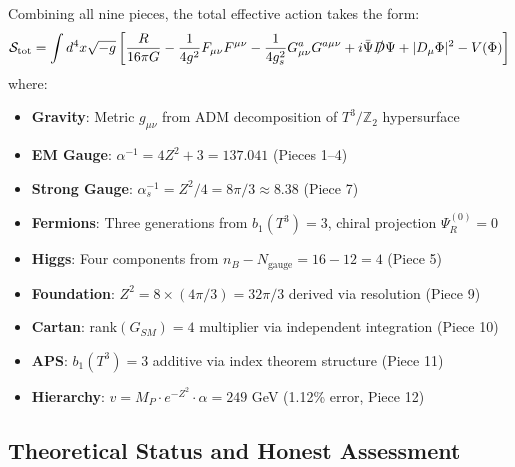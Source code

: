 \documentclass[12pt,a4paper]{article}
\newcommand{\Ztwo}{\mathbb{Z}_2}
\newcommand{\Tthree}{T^3}
\newcommand{\Zsq}{Z^2}
\begin{document}
Combining all nine pieces, the total effective action takes the form:
\begin{equation}
\mathcal{S}_{\text{tot}} = \int d^4x \sqrt{-g} \left[ \frac{R}{16\pi G} - \frac{1}{4g^2}F_{\mu\nu}F^{\mu\nu} - \frac{1}{4g_s^2}G^a_{\mu\nu}G^{a\mu\nu} + i\bar{\Psi}\slashed{D}\Psi + |D_\mu\Phi|^2 - V(\Phi) \right]
\end{equation}
where:
\begin{itemize}[itemsep=0pt]
    \item \textbf{Gravity}: Metric $g_{\mu\nu}$ from ADM decomposition of $\Tthree/\Ztwo$ hypersurface
    \item \textbf{EM Gauge}: $\alpha^{-1} = 4\Zsq + 3 = 137.041$ (Pieces 1--4)
    \item \textbf{Strong Gauge}: $\alpha_s^{-1} = \Zsq/4 = 8\pi/3 \approx 8.38$ (Piece 7)
    \item \textbf{Fermions}: Three generations from $b_1(T^3) = 3$, chiral projection $\Psi_R^{(0)} = 0$
    \item \textbf{Higgs}: Four components from $n_B - N_{\text{gauge}} = 16 - 12 = 4$ (Piece 5)
    \item \textbf{Foundation}: $\Zsq = 8 \times (4\pi/3) = 32\pi/3$ derived via resolution (Piece 9)
    \item \textbf{Cartan}: rank$(G_{SM}) = 4$ multiplier via independent integration (Piece 10)
    \item \textbf{APS}: $b_1(T^3) = 3$ additive via index theorem structure (Piece 11)
    \item \textbf{Hierarchy}: $v = M_P \cdot e^{-\Zsq} \cdot \alpha = 249$ GeV (1.12\% error, Piece 12)
\end{itemize}

\subsection{Theoretical Status and Honest Assessment}
\end{document}

